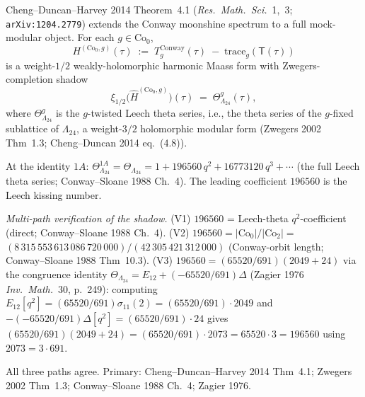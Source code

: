 \begin{remark}%
\label{rem:bkm-conway-mock-modular-umbral}%
%
%
Cheng--Duncan--Harvey 2014 Theorem~4.1 (\emph{Res.~Math.~Sci.}~1,~3;
\texttt{arXiv:1204.2779}) extends the Conway moonshine spectrum to a
full mock-modular object. For each $g \in \mathrm{Co}_0$,
\[
 H^{(\mathrm{Co}_0, g)}(\tau)
 \;:=\;
 T_g^{\mathrm{Conway}}(\tau) \;-\; \mathrm{trace}_g(\mathsf T(\tau))
\]
is a weight-$1/2$ weakly-holomorphic harmonic Maass form with
Zwegers-completion shadow
\[
 \xi_{1/2}\bigl(\widehat H^{(\mathrm{Co}_0, g)}\bigr)(\tau)
 \;=\;
 \Theta^g_{\Lambda_{24}}(\tau),
\]
where $\Theta^g_{\Lambda_{24}}$ is the $g$-twisted Leech theta series,
i.e., the theta series of the $g$-fixed sublattice of $\Lambda_{24}$,
a weight-$3/2$ holomorphic modular form
(Zwegers 2002 Thm~1.3; Cheng--Duncan 2014 eq.~(4.8)).

At the identity $1A$: $\Theta^{1A}_{\Lambda_{24}} = \Theta_{\Lambda_{24}}
= 1 + 196560\, q^2 + 16773120\, q^3 + \cdots$ (the full Leech theta
series; Conway--Sloane 1988 Ch.~4). The leading coefficient $196560$
is the Leech kissing number.

\emph{Multi-path verification of the shadow.}
(V1) $196560$ = Leech-theta $q^2$-coefficient (direct; Conway--Sloane
1988 Ch.~4).
(V2) $196560 = |\mathrm{Co}_0|/|\mathrm{Co}_2| = $
$(8\,315\,553\,613\,086\,720\,000)/(42\,305\,421\,312\,000)$
(Conway-orbit length; Conway--Sloane 1988 Thm~10.3).
(V3) $196560 = (65520/691)(2049 + 24)$ via the congruence identity
$\Theta_{\Lambda_{24}} = E_{12} + (-65520/691)\Delta$
(Zagier 1976 \emph{Inv.~Math.}~30, p.~249):
computing $E_{12}[q^2] = (65520/691)\sigma_{11}(2) = (65520/691) \cdot 2049$
and $-(-65520/691)\Delta[q^2] = (65520/691) \cdot 24$ gives
$(65520/691)(2049 + 24) = (65520/691) \cdot 2073 = 65520 \cdot 3 = 196560$
using $2073 = 3 \cdot 691$.

All three paths agree.
Primary: Cheng--Duncan--Harvey 2014 Thm~4.1;
Zwegers 2002 Thm~1.3;
Conway--Sloane 1988 Ch.~4;
Zagier 1976.
\end{remark}

